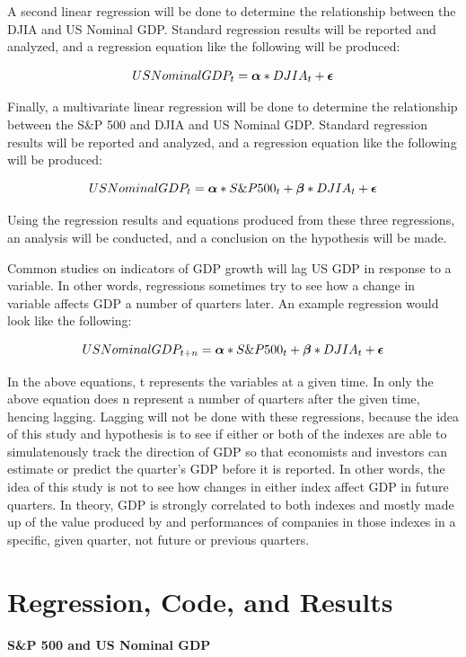 \documentclass[11pt]{article}
\numberwithin{equation}{section}
\def\alp{\mbox{\boldmath$\alpha$\unboldmath}}
\def\bet{\mbox{\boldmath$\beta$\unboldmath}}
\def\epsi{\mbox{\boldmath$\epsilon$\unboldmath}}
\begin{document}
A second linear regression will be done to determine the relationship between the DJIA and US Nominal GDP. Standard regression results will be reported and analyzed, and a regression equation like the following will be produced:

\[ US Nominal GDP_{t} = \alp*DJIA_{t} + \epsi \]

Finally, a multivariate linear regression will be done to determine the relationship between the S\&P 500 and DJIA and US Nominal GDP. Standard regression results will be reported and analyzed, and a regression equation like the following will be produced:

\[ US Nominal GDP_{t} = \alp*S\&P500_{t} + \bet*DJIA_{t} + \epsi \]

Using the regression results and equations produced from these three regressions, an analysis will be conducted, and a conclusion on the hypothesis will be made.

Common studies on indicators of GDP growth will lag US GDP in response to a variable. In other words, regressions sometimes try to see how a change in variable affects GDP a number of quarters later. An example regression would look like the following:

\[ US Nominal GDP_{t+n} = \alp*S\&P500_{t} + \bet*DJIA_{t} + \epsi \]

In the above equations, t represents the variables at a given time. In only the above equation does n represent a number of quarters after the given time, hencing lagging. Lagging will not be done with these regressions, because the idea of this study and hypothesis is to see if either or both of the indexes are able to simulatenously track the direction of GDP so that economists and investors can estimate or predict the quarter's GDP before it is reported. In other words, the idea of this study is not to see how changes in either index affect GDP in future quarters. In theory, GDP is strongly correlated to both indexes and mostly made up of the value produced by and performances of companies in those indexes in a specific, given quarter, not future or previous quarters.

\section{Regression, Code, and Results}

\paragraph{S\&P 500 and US Nominal GDP}
\end{document}
